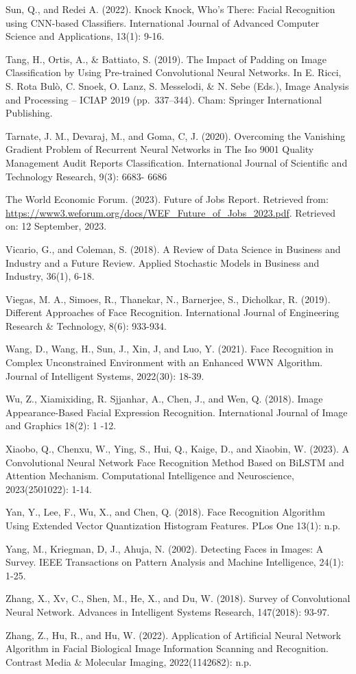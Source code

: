 \documentclass[
  12pt,
]{report}
\begin{document}
Sun, Q., and Redei A. (2022). Knock Knock, Who's There: Facial
Recognition using \hangindent=40pt CNN-based Classifiers. International
Journal of Advanced Computer Science and Applications, 13(1): 9-16.

Tang, H., Ortis, A., \& Battiato, S. (2019). The Impact of Padding on
Image \hangindent=40pt Classification by Using Pre-trained Convolutional
Neural Networks. In E. Ricci, S. Rota Bulò, C. Snoek, O. Lanz, S.
Messelodi, \& N. Sebe (Eds.), Image Analysis and Processing -- ICIAP
2019 (pp.~337--344). Cham: Springer International Publishing.

Tarnate, J. M., Devaraj, M., and Goma, C, J. (2020). Overcoming the
Vanishing Gradient \hangindent=40pt Problem of Recurrent Neural Networks
in The Iso 9001 Quality Management Audit Reports Classification.
International Journal of Scientific and Technology Research, 9(3): 6683-
6686

The World Economic Forum. (2023). Future of Jobs Report. Retrieved
from:\\
\hangindent=40pt
\url{https://www3.weforum.org/docs/WEF_Future_of_Jobs_2023.pdf}.
Retrieved on: 12 September, 2023.

Vicario, G., and Coleman, S. (2018). A Review of Data Science in
Business and Industry \hangindent=40pt and a Future Review. Applied
Stochastic Models in Business and Industry, 36(1), 6-18.

Viegas, M. A., Simoes, R., Thanekar, N., Barnerjee, S., Dicholkar, R.
(2019). Different \hangindent=40pt Approaches of Face Recognition.
International Journal of Engineering Research \& Technology, 8(6):
933-934.

Wang, D., Wang, H., Sun, J., Xin, J, and Luo, Y. (2021). Face
Recognition in Complex \hangindent=40pt Unconstrained Environment with
an Enhanced WWN Algorithm. Journal of Intelligent Systems, 2022(30):
18-39.

Wu, Z., Xiamixiding, R. Sjjanhar, A., Chen, J., and Wen, Q. (2018).
Image \hangindent=40pt Appearance-Based Facial Expression Recognition.
International Journal of Image and Graphics 18(2): 1 -12.

Xiaobo, Q., Chenxu, W., Ying, S., Hui, Q., Kaige, D., and Xiaobin, W.
(2023). A \hangindent=40pt Convolutional Neural Network Face Recognition
Method Based on BiLSTM and Attention Mechanism. Computational
Intelligence and Neuroscience, 2023(2501022): 1-14.

Yan, Y., Lee, F., Wu, X., and Chen, Q. (2018). Face Recognition
Algorithm Using Extended \hangindent=40pt Vector Quantization Histogram
Features. PLos One 13(1): n.p.

Yang, M., Kriegman, D, J., Ahuja, N. (2002). Detecting Faces in Images:
A Survey. IEEE \hangindent=40pt Transactions on Pattern Analysis and
Machine Intelligence, 24(1): 1-25.

Zhang, X., Xv, C., Shen, M., He, X., and Du, W. (2018). Survey of
Convolutional Neural \hangindent=40pt Network. Advances in Intelligent
Systems Research, 147(2018): 93-97.

Zhang, Z., Hu, R., and Hu, W. (2022). Application of Artificial Neural
Network Algorithm \hangindent=40pt in Facial Biological Image
Information Scanning and Recognition. Contrast Media \& Molecular
Imaging, 2022(1142682): n.p.
\end{document}
